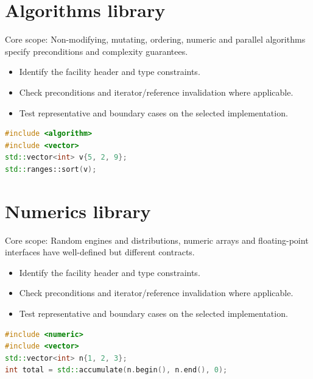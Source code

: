 \documentclass[11pt]{article}
\begin{document}
\section{Algorithms library}
Core scope: Non-modifying, mutating, ordering, numeric and parallel algorithms specify preconditions and complexity guarantees.

\begin{itemize}[leftmargin=*,itemsep=1pt,topsep=3pt]
\item Identify the facility header and type constraints.
\item Check preconditions and iterator/reference invalidation where applicable.
\item Test representative and boundary cases on the selected implementation.
\end{itemize}
\begin{lstlisting}[language=C++]
#include <algorithm>
#include <vector>
std::vector<int> v{5, 2, 9};
std::ranges::sort(v);
\end{lstlisting}
\section{Numerics library}
Core scope: Random engines and distributions, numeric arrays and floating-point interfaces have well-defined but different contracts.

\begin{itemize}[leftmargin=*,itemsep=1pt,topsep=3pt]
\item Identify the facility header and type constraints.
\item Check preconditions and iterator/reference invalidation where applicable.
\item Test representative and boundary cases on the selected implementation.
\end{itemize}
\begin{lstlisting}[language=C++]
#include <numeric>
#include <vector>
std::vector<int> n{1, 2, 3};
int total = std::accumulate(n.begin(), n.end(), 0);
\end{lstlisting}
\end{document}
